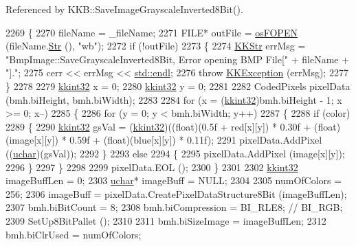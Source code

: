 Referenced by K\+K\+B\+::\+Save\+Image\+Grayscale\+Inverted8\+Bit().


\begin{DoxyCode}
2269 \{
2270   fileName = \_fileName;
2271   FILE*  outFile = \hyperlink{namespace_k_k_b_abf4050d2916ded8349dafadc80f0ecd1}{osFOPEN} (fileName.\hyperlink{class_k_k_b_1_1_k_k_str_ad574e6c0fe7f6ce1ba3ab0a8ce2fbd52}{Str} (), \textcolor{stringliteral}{"wb"});
2272   \textcolor{keywordflow}{if}  (!outFile)
2273   \{
2274     \hyperlink{class_k_k_b_1_1_k_k_str}{KKStr}  errMsg = \textcolor{stringliteral}{"BmpImage::SaveGrayscaleInverted8Bit,  Error opening BMP File["} + fileName + \textcolor{stringliteral}{"]."};
2275     cerr << errMsg << \hyperlink{namespace_k_k_b_ad1f50f65af6adc8fa9e6f62d007818a8}{std::endl};
2276     \textcolor{keywordflow}{throw} \hyperlink{class_k_k_b_1_1_k_k_exception}{KKException} (errMsg);
2277   \}
2278 
2279   \hyperlink{namespace_k_k_b_a8fa4952cc84fda1de4bec1fbdd8d5b1b}{kkint32}  x = 0;
2280   \hyperlink{namespace_k_k_b_a8fa4952cc84fda1de4bec1fbdd8d5b1b}{kkint32}  y = 0;
2281 
2282   CodedPixels pixelData (bmh.biHeight, bmh.biWidth);
2283 
2284   \textcolor{keywordflow}{for}  (x = (\hyperlink{namespace_k_k_b_a8fa4952cc84fda1de4bec1fbdd8d5b1b}{kkint32})bmh.biHeight - 1; x >= 0; x--)
2285   \{
2286     \textcolor{keywordflow}{for}  (y = 0; y < bmh.biWidth; y++)
2287     \{
2288       \textcolor{keywordflow}{if}  (color)
2289       \{
2290         \hyperlink{namespace_k_k_b_a8fa4952cc84fda1de4bec1fbdd8d5b1b}{kkint32}  gsVal = (\hyperlink{namespace_k_k_b_a8fa4952cc84fda1de4bec1fbdd8d5b1b}{kkint32})((\textcolor{keywordtype}{float})(0.5f + red[x][y]) * 0.30f + (\textcolor{keywordtype}{float})(image[x][y]) *
       0.59f + (\textcolor{keywordtype}{float})(blue[x][y]) * 0.11f);
2291         pixelData.AddPixel ((\hyperlink{namespace_k_k_b_ace9969169bf514f9ee6185186949cdf7}{uchar})(gsVal));
2292       \}
2293       \textcolor{keywordflow}{else}
2294       \{
2295         pixelData.AddPixel (image[x][y]);
2296       \}
2297     \}
2298 
2299     pixelData.EOL ();
2300   \}
2301 
2302   \hyperlink{namespace_k_k_b_a8fa4952cc84fda1de4bec1fbdd8d5b1b}{kkint32} imageBuffLen = 0;
2303   \hyperlink{namespace_k_k_b_ace9969169bf514f9ee6185186949cdf7}{uchar}*  imageBuff    = NULL;
2304 
2305   numOfColors = 256;
2306   imageBuff = pixelData.CreatePixelDataStructure8Bit (imageBuffLen);
2307   bmh.biBitCount    = 8;
2308   bmh.biCompression = BI\_RLE8; \textcolor{comment}{// BI\_RGB;}
2309   SetUp8BitPallet ();
2310 
2311   bmh.biSizeImage    = imageBuffLen; 
2312   bmh.biClrUsed      = numOfColors;

\end{DoxyCode}
